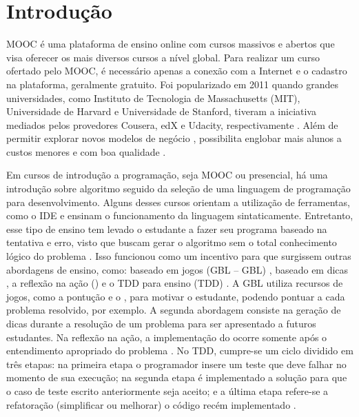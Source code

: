 \chapter{Introdução}

	\ac{MOOC} é uma plataforma de ensino online
	com cursos massivos e abertos que visa oferecer os mais diversos cursos a nível
	global. Para realizar um curso ofertado pelo \acs{MOOC}, é necessário apenas a conexão
	com a Internet e o cadastro na plataforma, geralmente gratuito. Foi popularizado
	em 2011 quando grandes universidades, como Instituto de Tecnologia de
	Massachusetts (MIT), Universidade de Harvard e Universidade de Stanford, tiveram
	a iniciativa mediados pelos provedores Cousera, edX e Udacity, respectivamente
	\cite{Mehlenbacher:2012}. Além de permitir explorar novos modelos de negócio
	\cite{dellarocas2013money}, possibilita englobar mais alunos a custos menores
	e com boa qualidade \cite{schmidt2013producing}.
	
	Em cursos de introdução a programação, seja \acs{MOOC} ou presencial, há uma introdução
	sobre algoritmo seguido da seleção de uma linguagem de programação para
	desenvolvimento. Alguns desses cursos orientam a utilização de ferramentas, como
	o \acs{IDE} e ensinam o funcionamento da linguagem sintaticamente.
	Entretanto, esse tipo de ensino tem levado o estudante a fazer seu programa baseado
	na tentativa e erro, visto que buscam gerar o algoritmo sem o total conhecimento
	lógico do problema \cite{edwards2003}. Isso funcionou como um incentivo para que
	surgissem outras abordagens de ensino, como: baseado em jogos  (\acs{GBL} -- \acl{GBL}) \cite{kapp2012gamification},
	baseado em dicas \cite{glassman2016learnersourcing}, a reflexão na ação () e o \acl{TDD} para ensino (\acs{TDD}) \cite{camara_graciottoSilva2016}.
	A \acs{GBL} utiliza recursos de jogos, como a pontução e o , para motivar
	o estudante, podendo pontuar a cada problema resolvido, por exemplo. A segunda abordagem
	consiste na geração de dicas durante a resolução de um problema para ser apresentado
	a futuros estudantes. Na reflexão na ação, a
	implementação do  ocorre somente após o entendimento apropriado
	do problema \cite{edwards2004}. No \acs{TDD}, cumpre-se um ciclo dividido em três etapas:
	na primeira etapa o programador insere um teste que deve falhar no momento de sua
	execução; na segunda etapa é implementado a solução para que o caso de teste
	escrito anteriormente seja aceito; e a última etapa refere-se a refatoração
	(simplificar ou melhorar) o código recém implementado \cite{beck2003}.
	

